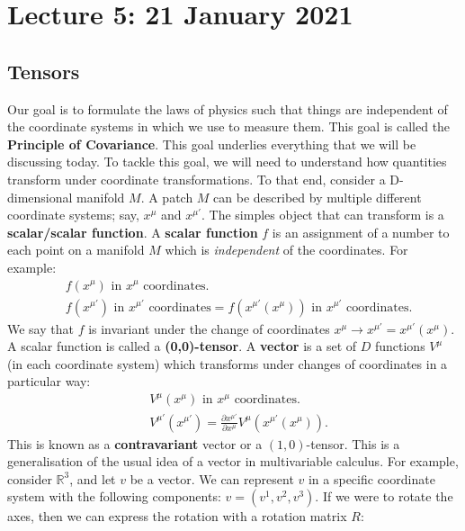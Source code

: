 \documentclass[11pt]{article}
\newcommand{\R}[0]{\mathbb{R}}
\theoremstyle{definition}
\begin{document}
\section{Lecture 5: 21 January 2021}
\subsection{Tensors}
Our goal is to formulate the laws of physics such that things are independent of the coordinate systems in which we use to measure them. This goal is called the \textbf{Principle of Covariance}. This goal underlies everything that we will be discussing today. To tackle this goal, we will need to understand how quantities transform under coordinate transformations. 
\newline
\newline
To that end, consider a D-dimensional manifold \( M \). A patch \( M \) can be described by multiple different coordinate systems; say, \( x^\mu \) and \( x^{\mu'} \). The simples object that can transform is a \textbf{scalar/scalar function}. 
\newline
\newline
A \textbf{scalar function} \( f \) is an assignment of a number to each point on a manifold \( M \) which is \emph{independent} of the coordinates. For example: 
\begin{align*}
	& f(x^\mu) \text{ in } x^\mu \text{ coordinates.} \\
	& f(x^{\mu'}) \text{ in } x^{\mu'} \text{ coordinates}  = f(x^{\mu'}(x^\mu)) \text{ in } x^{\mu'} \text{ coordinates.} 
\end{align*}
We say that \( f \) is invariant under the change of coordinates \( x^\mu \rightarrow x^{\mu'} = x^{\mu'}(x^\mu) \). A scalar function is called a \textbf{(0,0)-tensor}. 
\newline
\newline
A \textbf{vector} is a set of \( D \) functions \( V^\mu \) (in each coordinate system) which transforms under changes of coordinates in a particular way: 
\begin{align*}
	& V^\mu (x^\mu)  \text{ in } x^\mu \text{ coordinates.} \\
	& V^{\mu'} (x^{\mu'}) = \frac{\partial x^{\mu'}}{\partial x^\mu} V^\mu (x^{\mu'}(x^\mu)). 
\end{align*}
This is known as a \textbf{contravariant} vector or a \( (1,0) \)-tensor. This is a generalisation of the usual idea of a vector in multivariable calculus. For example, consider \( \R^3 \), and let \( v \) be a vector. We can represent \( v \) in a specific coordinate system with the following components: \( v = (v^1, v^2, v^3) \). If we were to rotate the axes, then we can express the rotation with a rotation matrix \( R \): 
\end{document}

